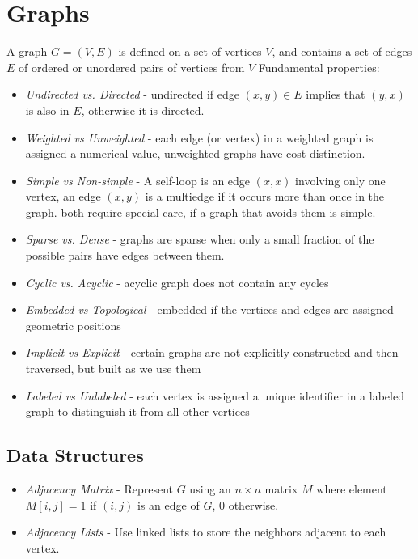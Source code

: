 \documentclass[10pt]{article}
\theoremstyle{definition}
\begin{document}
\section{Graphs}
A graph $G = (V, E)$ is defined on a set of vertices $V$, and contains a set of edges $E$ of ordered or unordered pairs of vertices from $V$
Fundamental properties:
\begin{itemize}
    \item \textit{Undirected vs. Directed} - undirected if edge $(x, y) \in E$ implies that $(y, x)$ is also in $E$, otherwise it is directed.
    \item \textit{Weighted vs Unweighted} - each edge (or vertex) in a weighted graph is assigned a numerical value, unweighted graphs have cost distinction.
    \item \textit{Simple vs Non-simple} - A self-loop is an edge $(x, x)$ involving only one vertex, an edge $(x, y)$ is a multiedge if it occurs more than once in the graph. both require special care, if a graph that avoids them is simple.
    \item \textit{Sparse vs. Dense} - graphs are sparse when only a small fraction of the possible pairs have edges between them.
    \item \textit{Cyclic vs. Acyclic} - acyclic graph does not contain any cycles
    \item \textit{Embedded vs Topological} - embedded if the vertices and edges are assigned geometric positions
    \item \textit{Implicit vs Explicit} - certain graphs are not explicitly constructed and then traversed, but built as we use them
    \item \textit{Labeled vs Unlabeled} - each vertex is assigned a unique identifier in a labeled graph to distinguish it from all other vertices
\end{itemize}

\subsection{Data Structures}
\begin{itemize}
    \item \textit{Adjacency Matrix} - Represent $G$ using an $n \times n$ matrix $M$ where element $M[i,j]=1$ if $(i, j)$ is an edge of $G$, $0$ otherwise.
    \item \textit{Adjacency Lists} - Use linked lists to store the neighbors adjacent to each vertex.
\end{itemize}
\end{document}
